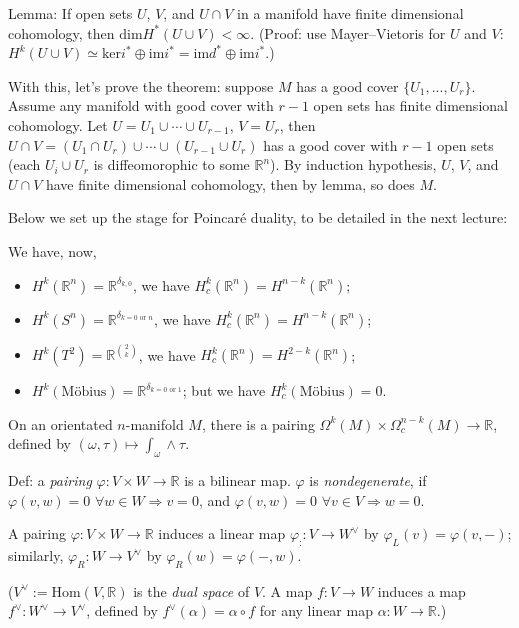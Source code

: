 \documentclass{article}
\theoremstyle{mystyle}
\theoremstyle{remark}
\numberwithin{equation}{section}
\begin{document}
Lemma: If open sets $U$, $V$, and $U\cap V$ in a manifold have finite dimensional cohomology, then $\mathrm{dim}H^*(U\cup V) <\infty$.  (Proof: use Mayer--Vietoris for $U$ and $V$: $H^k(U\cup V) \simeq \mathrm{ker}i^*\oplus \mathrm{im}i^* = \mathrm{im}d^*\oplus \mathrm{im}i^*$.)

With this, let's prove the theorem: suppose $M$ has a good cover $\{U_1,...,U_r\}$. Assume any manifold with good cover with $r-1$ open sets has finite dimensional cohomology. Let $U=U_1\cup\cdots \cup U_{r-1}$, $V=U_r$, then $U\cap V = (U_1\cap U_r)\cup \cdots \cup (U_{r-1}\cup U_r)$ has a good cover with $r-1$ open sets (each $U_i\cup U_r$ is diffeomorophic to some $\mathbb{R}^n$). By induction hypothesis, $U$, $V$, and $U\cap V$ have finite dimensional cohomology, then by lemma, so does $M$. 

Below we set up the stage for Poincar\'e duality, to be detailed in the next lecture:

We have, now,

\begin{itemize}
\item $H^k(\mathbb{R}^n) = \mathbb{R}^{\delta_{k,0}}$, we have $H^k_c(\mathbb{R}^n) = H^{n-k}(\mathbb{R}^n)$;
\item $H^k(S^n) = \mathbb{R}^{\delta_{k=0\text{ or }n}}$, we have $H^k_c(\mathbb{R}^n) = H^{n-k}(\mathbb{R}^n)$;
\item $H^k(T^2) = \mathbb{R}^{\binom{2}{k}}$, we have $H^k_c(\mathbb{R}^n) = H^{2-k}(\mathbb{R}^n)$;
\item $H^k(\text{Möbius}) = \mathbb{R}^{\delta_{k=0\text{ or }1}}$; but we have $H^k_c(\text{Möbius})=0$.
\end{itemize}

On an orientated $n$-manifold $M$, there is a pairing
$\Omega^k(M)\times \Omega^{n-k}_c(M)\rightarrow \mathbb{R}$, defined by $(\omega,\tau)\mapsto \int_\omega \wedge \tau$. 

Def: a \emph{pairing} $\varphi\colon V\times W\rightarrow \mathbb{R}$ is a bilinear map. $\varphi$ is \emph{nondegenerate}, if $\varphi(v,w)=0$ $\forall w\in W\Rightarrow v=0$, and $\varphi(v,w)=0$ $\forall v\in V\Rightarrow w=0$.

A pairing $\varphi\colon V\times W\rightarrow \mathbb{R}$ induces a linear map $\varphi_:\colon V\rightarrow W^\vee$ by $\varphi_L(v) = \varphi(v,-)$; similarly, $\varphi_R\colon W\rightarrow V^\vee$ by $\varphi_R(w)=\varphi(-,w)$. 

($V^\vee:=\mathrm{Hom}(V,\mathbb{R})$ is the \emph{dual space} of $V$. A map $f\colon V\rightarrow W$ induces a map $f^\vee\colon W^\vee\rightarrow V^\vee$, defined by $f^\vee(\alpha) = \alpha\circ f$ for any linear map $\alpha \colon W\rightarrow \mathbb{R}$.)
\end{document}
